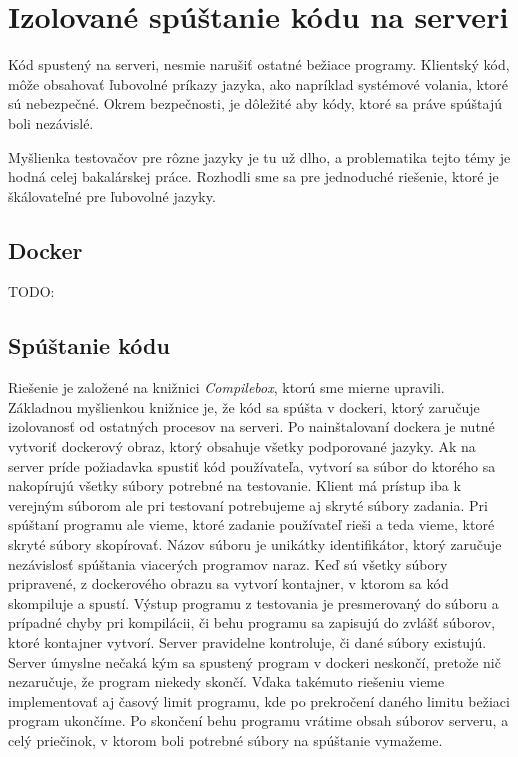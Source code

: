 \section{Izolované spúštanie kódu na serveri}
Kód spustený na serveri, nesmie narušiť ostatné bežiace programy. Klientský kód, môže obsahovať
ľubovolné príkazy jazyka, ako napríklad systémové volania, ktoré sú nebezpečné. Okrem bezpečnosti,
je dôležité aby kódy, ktoré sa práve spúštajú boli nezávislé. 

Myšlienka testovačov pre rôzne jazyky je tu už dlho, a problematika tejto témy je hodná celej
bakalárskej práce. Rozhodli sme sa pre jednoduché riešenie, ktoré je škálovateľné pre ľubovolné
jazyky. 

\subsection{Docker}
TODO:

\subsection{Spúštanie kódu}
Riešenie je založené na knižnici \textit{Compilebox}, ktorú sme mierne upravili. Základnou
myšlienkou knižnice je, že kód sa spúšta v dockeri, ktorý zaručuje izolovanosť od ostatných
procesov na serveri. Po nainštalovaní dockera je nutné vytvoriť dockerový obraz, ktorý obsahuje
všetky podporované jazyky. Ak na server príde požiadavka spustiť kód používateľa, vytvorí sa súbor
do ktorého sa nakopírujú všetky súbory potrebné na testovanie. Klient má prístup iba k verejným
súborom ale pri testovaní potrebujeme aj skryté súbory zadania. Pri spúštaní programu ale vieme,
ktoré zadanie používateľ rieši a teda vieme, ktoré skryté súbory skopírovať. Názov súboru je
unikátky identifikátor, ktorý zaručuje nezávislosť spúštania viacerých programov naraz. Keď sú
všetky súbory pripravené, z dockerového obrazu sa vytvorí kontajner, v ktorom sa kód skompiluje a
spustí. Výstup programu z testovania je presmerovaný do súboru a prípadné chyby pri kompilácii, či
behu programu sa zapisujú do zvlášť súborov, ktoré kontajner vytvorí. Server pravidelne kontroluje,
či dané súbory existujú. Server úmyslne nečaká kým sa spustený program v dockeri neskončí, pretože
nič nezaručuje, že program niekedy skončí. Vďaka takémuto riešeniu vieme implementovať aj časový
limit programu, kde po prekročení daného limitu bežiaci program ukončíme. Po skončení behu programu
vrátime obsah súborov serveru, a celý priečinok, v ktorom boli potrebné súbory na spúštanie
vymažeme.
